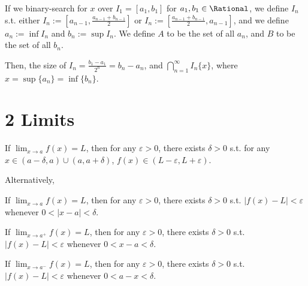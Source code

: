 \begin{theorem}
If we binary-search for $x$ over $I_1 = [a_1, b_1]$ for $a_1, b_1 \in \Rational$, 
we define $I_n$ s.t. either $I_n := [a_{n-1}, \frac{a_{n-1} + b_{n-1}}{2}]$ or 
$I_n := [\frac{a_{n-1} + b_{n-1}}{2}, a_{n-1}]$, and we define $a_n := \inf I_n$ 
and $b_n := \sup I_n$. We define $A$ to be the set of all $a_n$, and $B$ to be 
the set of all $b_n$.

Then, the size of $I_n = \frac{b_1 - a_1}{2^n} = b_n - a_n$, and $\displaystyle \bigcap_{n=1}^{\infty}I_n \{x\}$, where $x = \sup \{a_n\} = \inf \{ b_n \}$.
\end{theorem}

\section*{2 Limits}


\begin{definition}[Limit]
  If $\displaystyle\lim_{x \to a} f(x) = L$, then for any $\varepsilon > 0$, there exists $\delta > 0$ s.t. for any $x \in (a - \delta, a) \cup (a, a + \delta)$, $f(x) \in (L - \varepsilon, L + \varepsilon)$.
\end{definition}

Alternatively,

\begin{definition}[Limit]
  If $\displaystyle\lim_{x \to a} f(x) = L$, then for any $\varepsilon > 0$, there exists $\delta > 0$ s.t. $|f(x) - L| < \varepsilon$ whenever $0 < |x - a| < \delta$.
\end{definition}

\begin{definition}
  If $\displaystyle\lim_{x \to a^+} f(x) = L$, then for any $\varepsilon > 0$, there exists $\delta > 0$ s.t. $|f(x) - L| < \varepsilon$ whenever $0 < x - a < \delta$.
\end{definition}

\begin{definition}
  If $\displaystyle\lim_{x \to a^-} f(x) = L$, then for any $\varepsilon > 0$, there exists $\delta > 0$ s.t. $|f(x) - L| < \varepsilon$ whenever $0 < a - x < \delta$.
\end{definition}


